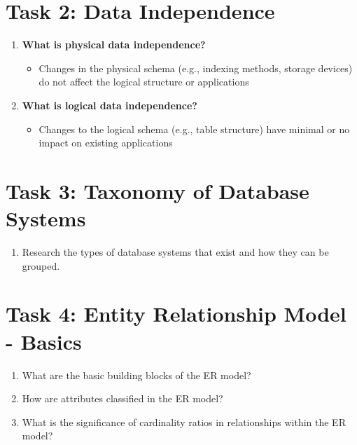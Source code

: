 \documentclass[10pt,a4paper]{article}
\begin{document}

\section*{Task 2: Data Independence}
\begin{enumerate}
\item \textbf{What is physical data independence?}
\begin{itemize}
	\item Changes in the physical schema (e.g., indexing methods, storage devices) do not affect the logical structure or applications
\end{itemize}

\item \textbf{What is logical data independence?}
\begin{itemize}
	\item Changes to the logical schema (e.g., table structure) have minimal or no impact on existing applications
\end{itemize}
\end{enumerate}


\section*{Task 3: Taxonomy of Database Systems}
\begin{enumerate}
\item Research the types of database systems that exist and how they can be grouped.
\end{enumerate}



\section*{Task 4: Entity Relationship Model - Basics}
\begin{enumerate}
\item What are the basic building blocks of the ER model?

\item How are attributes classified in the ER model?

\item What is the significance of cardinality ratios in relationships within the ER model?
\end{enumerate}


\end{document}
